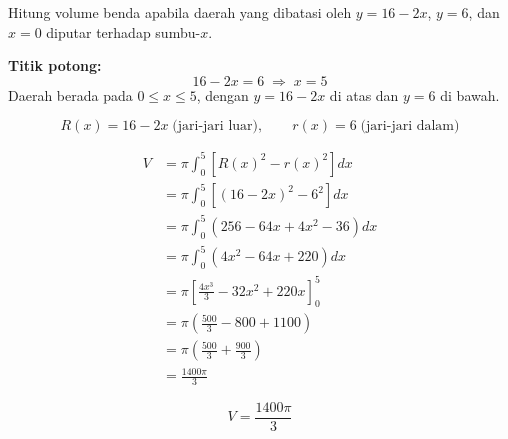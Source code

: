 \documentclass[12pt]{article}
\begin{document}
Hitung volume benda apabila daerah yang dibatasi oleh $y = 16 - 2x$, $y = 6$, dan $x = 0$ diputar terhadap sumbu-$x$.

\textbf{Titik potong:}
\[
16 - 2x = 6 \;\Rightarrow\; x = 5
\]
Daerah berada pada $0 \le x \le 5$, dengan $y = 16 - 2x$ di atas dan $y = 6$ di bawah.

\[
R(x) = 16 - 2x \;\text{(jari-jari luar)}, \qquad r(x) = 6 \;\text{(jari-jari dalam)}
\]

\begin{align*}
V &= \pi\int_0^5 \left[R(x)^2 - r(x)^2\right] dx \\
&= \pi\int_0^5 \left[(16 - 2x)^2 - 6^2\right] dx \\
&= \pi\int_0^5 \left(256 - 64x + 4x^2 - 36\right) dx \\
&= \pi\int_0^5 \left(4x^2 - 64x + 220\right) dx \\
&= \pi\left[\frac{4x^3}{3} - 32x^2 + 220x\right]_0^5 \\
&= \pi\left(\frac{500}{3} - 800 + 1100\right) \\
&= \pi\left(\frac{500}{3} + \frac{900}{3}\right) \\
&= \frac{1400\pi}{3}
\end{align*}

\[
V = \frac{1400\pi}{3}
\]
\end{document}
